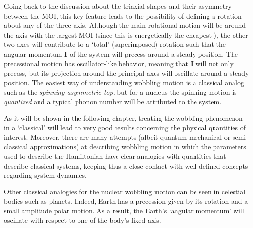 Going back to the discussion about the triaxial shapes and their asymmetry between the MOI, this key feature leads to the possibility of defining a rotation about any of the three axis. Although the main rotational motion will be around the axis with the largest MOI (since this is energetically the cheapest \cite{bohr1954rotational}), the other two axes will contribute to a `total' (superimposed) rotation such that the angular momentum $\mathbf{I}$ of the system will precess around a steady position. The precessional motion has oscillator-like behavior, meaning that $\mathbf{I}$ will not only precess, but its projection around the principal axes will oscillate around a steady position.
The easiest way of understanding wobbling motion is a classical analog such as the \emph{spinning asymmetric top}, but for a nucleus the spinning motion is \emph{quantized} and a typical phonon number will be attributed to the system.

As it will be shown in the following chapter, treating the wobbling phenomenon in a `classical' will lead to very good results concerning the physical quantities of interest. Moreover, there are many attempts (albeit quantum mechanical or semi-classical approximations) at describing wobbling motion in which the parameters used to describe the Hamiltonian have clear analogies with quantities that describe classical systems, keeping thus a close contact with well-defined concepts regarding system dynamics.

Other classical analogies for the nuclear wobbling motion can be seen in celestial bodies such as planets. Indeed, Earth has a precession given by its rotation and a small amplitude polar motion. As a result, the Earth's `angular momentum' will oscillate with respect to one of the body's fixed axis.
